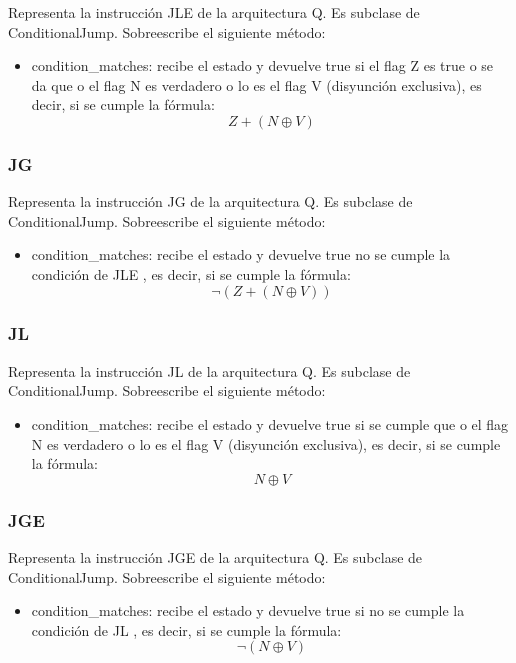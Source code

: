 Representa la instrucción JLE de la arquitectura Q. Es subclase de ConditionalJump. Sobreescribe el siguiente método:
\begin{itemize}
\item condition\_matches: recibe el estado y devuelve true si el flag Z es true o se da que o el flag N es verdadero o lo es el flag V (disyunción exclusiva), es decir, si se cumple la fórmula: \[Z + (N \oplus V) \]
\end{itemize}

\subsubsection{JG}
Representa la instrucción JG de la arquitectura Q. Es subclase de ConditionalJump. Sobreescribe el siguiente método:
\begin{itemize}
\item condition\_matches: recibe el estado y devuelve true no se cumple la condición de JLE , es decir, si se cumple la fórmula: \[\neg(Z + (N \oplus V)) \]
\end{itemize}

\subsubsection{JL}
\label{subsubsec:jl}

Representa la instrucción JL de la arquitectura Q. Es subclase de ConditionalJump. Sobreescribe el siguiente método:
\begin{itemize}
\item condition\_matches: recibe el estado y devuelve true si se cumple que o el flag N es verdadero o lo es el flag V (disyunción exclusiva), es decir, si se cumple la fórmula: \[N \oplus V \]
\end{itemize}

\subsubsection{JGE}
Representa la instrucción JGE de la arquitectura Q. Es subclase de ConditionalJump. Sobreescribe el siguiente método:
\begin{itemize}
\item condition\_matches: recibe el estado y devuelve true si no se cumple la condición de JL , es decir, si se cumple la fórmula: \[\neg(N \oplus V) \]
\end{itemize}

